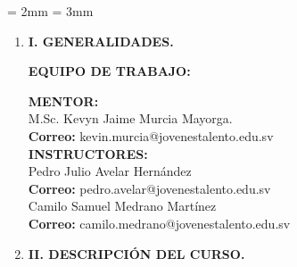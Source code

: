 
%

\parskip = 2mm   %
\parindent = 3mm



\thispagestyle{empty}

\newpage

\begin{enumerate}
\thispagestyle{empty}

\item  {\bf \large  I. GENERALIDADES.}

\vspace{1cm}
{\bf EQUIPO DE TRABAJO:}


\textbf{MENTOR:}\\
 M.Sc. Kevyn Jaime Murcia Mayorga.\\
\textbf{Correo:} kevin.murcia@jovenestalento.edu.sv\\

\textbf{INSTRUCTORES:}\\
Pedro Julio Avelar Hernández\\
\textbf{Correo:} pedro.avelar@jovenestalento.edu.sv\\

Camilo Samuel Medrano Martínez\\
\textbf{Correo:} camilo.medrano@jovenestalento.edu.sv\\


\item {\bf \large II. DESCRIPCI\'ON DEL CURSO.}\\


\end{enumerate}
